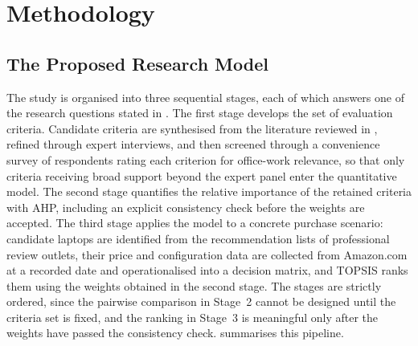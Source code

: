 \chapter{Methodology}\label{ch:methodology}


\section{The Proposed Research Model}\label{sec:framework}

The study is organised into three sequential stages, each of which answers one of the
research questions stated in . The first stage develops the set of
evaluation criteria. Candidate criteria are synthesised from the literature reviewed in
, refined through expert interviews, and then screened through a
convenience survey of respondents rating each criterion for office-work relevance, so that
only criteria receiving broad support beyond the expert panel enter the quantitative model.
The second stage quantifies the relative importance
of the retained criteria with AHP, including an explicit consistency check before the
weights are accepted. The third stage applies the model to a concrete purchase scenario:
candidate laptops are identified from the recommendation lists of professional review
outlets, their price and configuration data are collected from Amazon.com at a recorded
date and operationalised into a decision matrix, and TOPSIS ranks them using the weights
obtained in the second stage. The stages are
strictly ordered, since the pairwise comparison in Stage~2 cannot be designed until the criteria
set is fixed, and the ranking in Stage~3 is meaningful only after the weights have passed
the consistency check.  summarises this pipeline.

